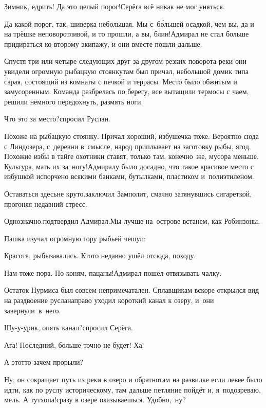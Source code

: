 \diagdash Зимник, едрить! Да это целый порог!\mdash Серёга всё никак не мог уняться.

\diagdash Да какой порог, так, шиверка небольшая. Мы с~б\'{о}льшей осадкой, чем вы, да и на трёшке неповоротливой, и то прошли, а вы, блин!\mdash Адмирал не стал больше придираться ко второму экипажу, и они вместе пошли дальше. 

Спустя три или четыре следующих друг за другом резких поворота реки они увидели огромную рыбацкую стоянку\mdash там был причал, небольшой домик типа сарая, состоящий из комнаты с печкой и террасы. Место было обжитым и замусоренным. Команда разбрелась по берегу, все вытащили термосы с чаем, решили немного передохнуть, размять ноги.

\diagdash Что это за место?\mdash спросил Руслан.

\diagdash Похоже на рыбацкую стоянку. Причал хороший, избушечка тоже. Вероятно сюда с Линдозера, с~деревни в~смысле, народ приплывает на заготовку рыбы, ягод. Похожие избы в тайге охотники ставят, только там, конечно~же, мусора меньше. Культура, мать их за~ногу!\mdash Адмиралу было досадно, что такое красивое место с избушкой испорчено всякими банками, бутылками, пластиком и~полиэтиленом.

\diagdash Оставаться здесь\mdash не круто.\mdash заключил Замполит, смачно затянувшись сигареткой, прогоняя недавний стресс.

\diagdash Однозначно.\mdash подтвердил Адмирал.\mdash Мы лучше на~острове встанем, как Робинзоны.

Пашка изучал огромную гору рыбьей чешуи:

\diagdash Красота, рыбы\mdash завались. Кто\sdash то недавно ушёл отсюда, походу.

\diagdash Нам тоже пора. По коням, пацаны!\mdash Адмирал пошёл отвязывать чалку.

Остаток Нурмиса был совсем непримечатален. Сплавщикам вскоре открылся вид на раздвоение русла\mdash направо уходил короткий канал к озеру, и~они завернули~в~него.

\diagdash Шу-у-урик, опять канал?\mdash спросил Серёга.

\diagdash Ага! Последний, больше точно не будет! Ха!

\diagdash А этот\sdash то зачем прорыли? 

\diagdash Ну, он сокращает путь из реки в озеро и обратно\mdash там на развилке если левее было идти, как по руслу историческому, там дальше петляние пойдёт и, я~подозреваю, мель. А тут\mdash хопа!\mdash сразу в озере оказываешься. Удобно,~ну?


